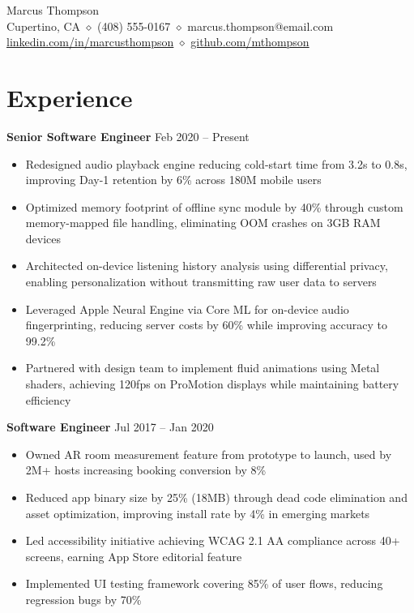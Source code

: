 \documentclass[11pt,letterpaper]{article}
\begin{document}
\begin{center}
{\Huge Marcus Thompson}\\[8pt]
{\color{accent}\small Cupertino, CA \quad $\diamond$ \quad (408) 555-0167 \quad $\diamond$ \quad marcus.thompson@email.com}\\[2pt]
{\color{accent}\small \href{https://linkedin.com/in/marcusthompson}{linkedin.com/in/marcusthompson} \quad $\diamond$ \quad \href{https://github.com/mthompson}{github.com/mthompson}}
\end{center}

\vspace{8pt}

\section{Experience}

\textbf{Senior Software Engineer}   \hfill Feb 2020 -- Present
\begin{itemize}
    \item Redesigned audio playback engine reducing cold-start time from 3.2s to 0.8s, improving Day-1 retention by 6\% across 180M mobile users
    \item Optimized memory footprint of offline sync module by 40\% through custom memory-mapped file handling, eliminating OOM crashes on 3GB RAM devices
    \item Architected on-device listening history analysis using differential privacy, enabling personalization without transmitting raw user data to servers
    \item Leveraged Apple Neural Engine via Core ML for on-device audio fingerprinting, reducing server costs by 60\% while improving accuracy to 99.2\%
    \item Partnered with design team to implement fluid animations using Metal shaders, achieving 120fps on ProMotion displays while maintaining battery efficiency
\end{itemize}

\vspace{4pt}
\textbf{Software Engineer}   \hfill Jul 2017 -- Jan 2020
\begin{itemize}
    \item Owned AR room measurement feature from prototype to launch, used by 2M+ hosts increasing booking conversion by 8\%
    \item Reduced app binary size by 25\% (18MB) through dead code elimination and asset optimization, improving install rate by 4\% in emerging markets
    \item Led accessibility initiative achieving WCAG 2.1 AA compliance across 40+ screens, earning App Store editorial feature
    \item Implemented UI testing framework covering 85\% of user flows, reducing regression bugs by 70\%
\end{itemize}
\end{document}
